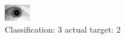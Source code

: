 \begin{figure}[h!]
\begin{center}
\includegraphics[width=0.60\columnwidth]{figures/ID1759_class_3_target_2.png}
\end{center}
\caption{ Classification: 3 actual target: 2}
\label{fig:ID1759_class_3_target_2}
\end{figure}
